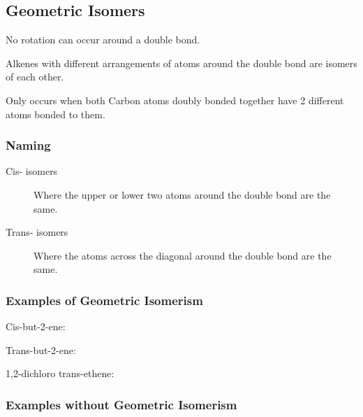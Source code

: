 \documentclass[a4paper,11pt]{article}
\begin{document}
\subsection{Geometric Isomers}

No rotation can occur around a double bond.

Alkenes with different arrangements of atoms around the double bond are isomers
of each other.

Only occurs when both Carbon atoms doubly bonded together have 2 different
atoms bonded to them.


\subsubsection{Naming}

\begin{description}
\item [Cis- isomers] Where the upper or lower two atoms around the double bond
	are the same.
\item [Trans- isomers] Where the atoms across the diagonal around the double
	bond are the same.
\end{description}


\subsubsection{Examples of Geometric Isomerism}

Cis-but-2-ene:

\begin{center}
\end{center}

Trans-but-2-ene:

\begin{center}
\end{center}

1,2-dichloro trans-ethene:

\begin{center}
\end{center}


\subsubsection{Examples without Geometric Isomerism}
\end{document}
